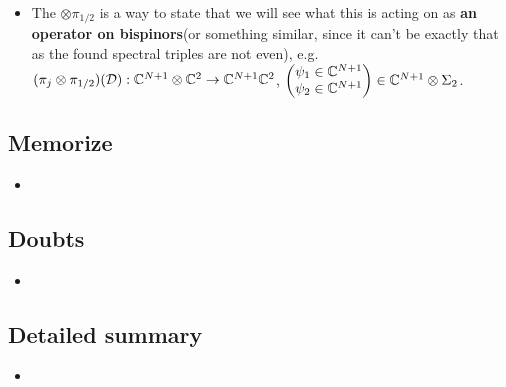 \documentclass{article}
\begin{document}
    \begin{itemize}

    \item The $\otimes \pi_{1/2}$ is a way to state that we will see what this is acting on as \textbf{an operator on bispinors}(or something similar, since it can't be exactly that as the found spectral triples are not even), e.g. $(\pi_j \otimes \pi_{1/2})(\mathcal D): \mathbb{C}^{N+1}\otimes \mathbb{C}^2 \to \mathbb{C}^{N+1}\mathbb{C}^2$, $\begin{pmatrix} \psi_1 \in \mathbb{C}^{N+1} \\ \psi_2 \in \mathbb{C}^{N+1} \end{pmatrix} \in \mathbb{C}^{N+1}\otimes \Sigma_2$.
    
    \end{itemize}

\subsection{Memorize}

    \begin{itemize}

    \item 
    
    \end{itemize}

\subsection{Doubts}

    \begin{itemize}

    \item 
    
    \end{itemize}

\subsection{Detailed summary}

    \begin{itemize}

    \item 
    
    \end{itemize}
\end{document}
